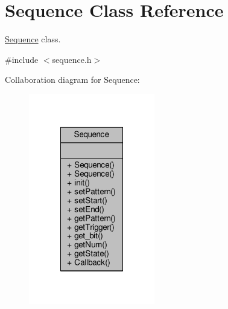 \hypertarget{classSequence}{\section{Sequence Class Reference}
\label{classSequence}
}


\hyperlink{classSequence}{Sequence} class.  




{\ttfamily \#include $<$sequence.\-h$>$}



Collaboration diagram for Sequence\-:\nopagebreak
\begin{figure}[H]
\begin{center}
\leavevmode
\includegraphics[width=156pt]{classSequence__coll__graph}
\end{center}
\end{figure}
